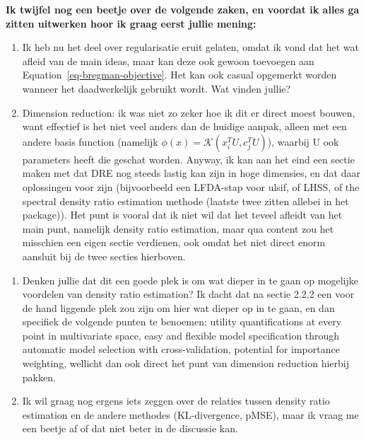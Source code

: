 \documentclass[
]{article}
\begin{document}
\textbf{Ik twijfel nog een beetje over de volgende zaken, en voordat ik
alles ga zitten uitwerken hoor ik graag eerst jullie mening:}

\begin{enumerate}
\def\labelenumi{\arabic{enumi}.}
\item
  Ik heb nu het deel over regularisatie eruit gelaten, omdat ik vond dat
  het wat afleid van de main ideas, maar kan deze ook gewoon toevoegen
  aan Equation~\ref{eq-bregman-objective}. Het kan ook casual opgemerkt
  worden wanneer het daadwerkelijk gebruikt wordt. Wat vinden jullie?
\item
  Dimension reduction: ik was niet zo zeker hoe ik dit er direct moest
  bouwen, want effectief is het niet veel anders dan de huidige aanpak,
  alleen met een andere basis function (namelijk
  \(\phi(x) = \mathcal{K}(x_i^T U, c_j^T U)\)), waarbij U ook parameters
  heeft die geschat worden. Anyway, ik kan aan het eind een sectie maken
  met dat DRE nog steeds lastig kan zijn in hoge dimensies, en dat daar
  oplossingen voor zijn (bijvoorbeeld een LFDA-stap voor ulsif, of LHSS,
  of the spectral density ratio estimation methode (laatste twee zitten
  allebei in het package)). Het punt is vooral dat ik niet wil dat het
  teveel afleidt van het main punt, namelijk density ratio estimation,
  maar qua content zou het misschien een eigen sectie verdienen, ook
  omdat het niet direct enorm aansluit bij de twee secties hierboven.
\end{enumerate}

\begin{enumerate}
\def\labelenumi{\arabic{enumi}.}
\setcounter{enumi}{2}
\item
  Denken jullie dat dit een goede plek is om wat dieper in te gaan op
  mogelijke voordelen van density ratio estimation? Ik dacht dat na
  sectie 2.2.2 een voor de hand liggende plek zou zijn om hier wat
  dieper op in te gaan, en dan specifiek de volgende punten te benoemen:
  utility quantifications at every point in multivariate space, easy and
  flexible model specification through automatic model selection with
  cross-validation, potential for importance weighting, wellicht dan ook
  direct het punt van dimension reduction hierbij pakken.
\item
  Ik wil graag nog ergens iets zeggen over de relaties tussen density
  ratio estimation en de andere methodes (KL-divergence, pMSE), maar ik
  vraag me een beetje af of dat niet beter in de discussie kan.
\end{enumerate}
\end{document}
